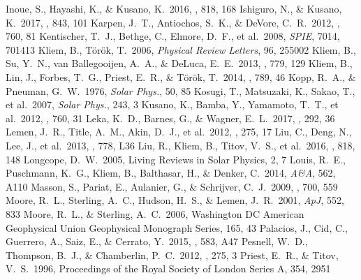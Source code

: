\documentclass[10pt,preprint2]{aastex}
\begin{document}
\begin{thebibliography}{}
 Inoue, S., Hayashi, K., \& Kusano, K.\ 2016, \apj, 818, 168 
 Ishiguro, N., \& Kusano, K.\ 2017, \apj, 843, 101 
 Karpen, J.~T., Antiochos, S.~K., \& DeVore, C.~R.\ 2012, \apj, 760, 81 
 Kentischer, T.~J., Bethge, C., Elmore, D.~F., et al.\ 2008, {\it SPIE}, 7014, 701413
 Kliem, B., T{\"o}r{\"o}k, T.\ 2006, {\it Physical Review Letters}, 96, 255002 
 Kliem, B., Su, Y.~N., van Ballegooijen, A.~A., \& DeLuca, E.~E.\ 2013, \apj, 779, 129 
 Kliem, B., Lin, J., Forbes, T.~G., Priest, E.~R., \& T{\"o}r{\"o}k, T.\ 2014, \apj, 789, 46 
 Kopp, R.~A., \& Pneuman, G.~W.\ 1976, {\it Solar Phys.}, 50, 85
 Kosugi, T., Matsuzaki, K., Sakao, T., et al.\ 2007, {\it Solar Phys.}, 243, 3 
 Kusano, K., Bamba, Y., Yamamoto, T.~T., et al.\ 2012, \apj, 760, 31
 Leka, K.~D., Barnes, G., \& Wagner, E.~L.\ 2017, \solphys, 292, 36 
 Lemen, J.~R., Title, A.~M., Akin, D.~J., et al.\ 2012, \solphys, 275, 17
 Liu, C., Deng, N., Lee, J., et al.\ 2013, \apjl, 778, L36 
 Liu, R., Kliem, B., Titov, V.~S., et al.\ 2016, \apj, 818, 148 
 Longcope, D.~W.\ 2005, Living Reviews in Solar Physics, 2, 7 
 Louis, R.~E., Puschmann, K.~G., Kliem, B., Balthasar, H., \& Denker, C.\ 2014, {\it A\&A}, 562, A110
 Masson, S., Pariat, E., Aulanier, G., \& Schrijver, C.~J.\ 2009, \apj, 700, 559
 Moore, R.~L., Sterling, A.~C., Hudson, H.~S., \& Lemen, J.~R.\ 2001, {\it ApJ}, 552, 833
 Moore, R.~L., \& Sterling, A.~C.\ 2006, Washington DC American Geophysical Union Geophysical Monograph Series, 165, 43 
 Palacios, J., Cid, C., Guerrero, A., Saiz, E., \& Cerrato, Y.\ 2015, \aap, 583, A47 
 Pesnell, W.~D., Thompson, B.~J., \& Chamberlin, P.~C.\ 2012, \solphys, 275, 3
 Priest, E.~R., \& Titov, V.~S.\ 1996, Proceedings of the Royal Society of London Series A, 354, 2951

\end{thebibliography}
\end{document}
